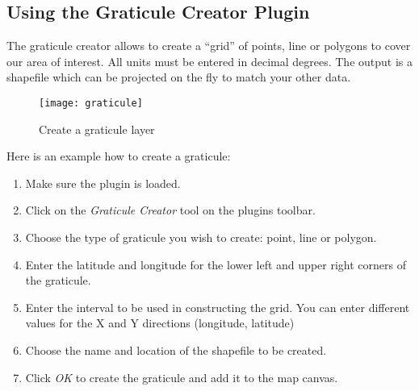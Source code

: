 \subsection{Using the Graticule Creator Plugin}

The graticule creator allows to create a ``grid'' of points, line or
polygons to cover our area of interest. All units must be entered in
decimal degrees. The output is a shapefile which can be projected on the
fly to match your other data.

\begin{figure}[ht]
\begin{center}
  \caption{Create a graticule layer}\label{fig:graticule}\smallskip
  \texttt{[image: graticule]}
\end{center}
\end{figure}

Here is an example how to create a graticule:

\begin{enumerate}
\item Make sure the plugin is loaded.
\item Click on the \textsl{Graticule Creator} tool on the plugins toolbar.
\item Choose the type of graticule you wish to create: point, line or
  polygon.
\item Enter the latitude and longitude for the lower left and upper right
  corners of the graticule.
\item Enter the interval to be used in constructing the grid. You can
  enter different values for the X and Y directions (longitude, latitude)
\item Choose the name and location of the shapefile to be created.
\item Click \textsl{OK} to create the graticule and add it to the map
  canvas.
\end{enumerate} 


